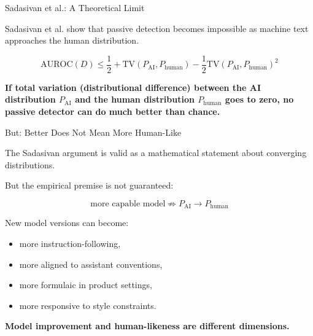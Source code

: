 \documentclass[11pt,compress,t,notes=noshow, xcolor=table]{beamer}
\begin{document}
\begin{vbframe}{Sadasivan et al.: A Theoretical Limit}

Sadasivan et al. show that passive detection becomes impossible as machine text approaches the human distribution.

\[
\mathrm{AUROC}(D)
\leq
\frac{1}{2}
+
\mathrm{TV}(P_{\mathrm{AI}},P_{\mathrm{human}})
-
\frac{1}{2}\mathrm{TV}(P_{\mathrm{AI}},P_{\mathrm{human}})^2
\]

\begin{center}
\textbf{If total variation (distributional difference) between the AI distribution $P_{\mathrm{AI}}$ and the human distribution $P_{\mathrm{human}}$ goes to zero, no passive detector can do much better than chance.}
\end{center}


\end{vbframe}

\begin{vbframe}{But: Better Does Not Mean More Human-Like}

The Sadasivan argument is valid as a mathematical statement about converging distributions.

But the empirical premise is not guaranteed:

\[
\text{more capable model}
\not\Rightarrow
P_{\mathrm{AI}} \to P_{\mathrm{human}}
\]

New model versions can become:

\begin{itemize}
    \item more instruction-following,
    \item more aligned to assistant conventions,
    \item more formulaic in product settings,
    \item more responsive to style constraints.
\end{itemize}

\begin{center}
\textbf{Model improvement and human-likeness are different dimensions.}
\end{center}

\end{vbframe}
\end{document}
